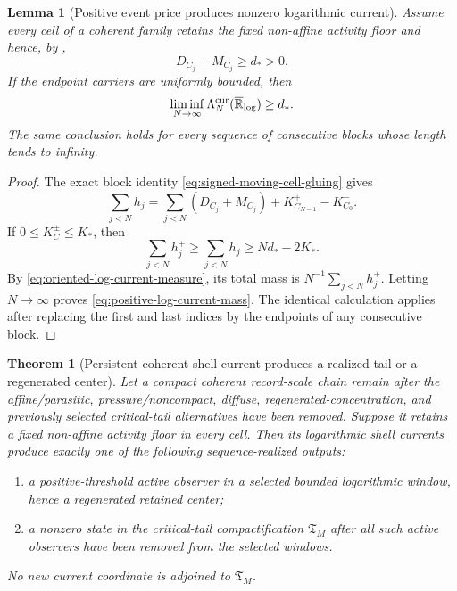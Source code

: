 \documentclass[11pt]{amsart}
\numberwithin{equation}{section}
\theoremstyle{plain}
\newtheorem{theorem}{Theorem}[section]
\newtheorem{lemma}[lemma]{Lemma}
\theoremstyle{definition}
\theoremstyle{remark}
\newcommand{\Tcrit}{\mathfrak T_M}
\begin{document}
\begin{lemma}[Positive event price produces nonzero logarithmic current]
\label{lem:positive-price-nonzero-log-current}
Assume every cell of a coherent family retains the fixed non-affine activity
floor and hence, by ,
\begin{equation}\label{eq:uniform-cell-price}
 D_{C_j}+M_{C_j}\ge d_*>0.
\end{equation}
If the endpoint carriers are uniformly bounded, then
\begin{equation}\label{eq:positive-log-current-mass}
 \liminf_{N\to\infty}
 \Lambda_N^{\rm cur}(\overline{\mathbb R}_{\log})
 \ge d_*.
\end{equation}
The same conclusion holds for every sequence of consecutive blocks whose
length tends to infinity.
\end{lemma}

\begin{proof}
The exact block identity \eqref{eq:signed-moving-cell-gluing} gives
\[
 \sum_{j<N}h_j
 =\sum_{j<N}(D_{C_j}+M_{C_j})
   +K_{C_{N-1}}^+-K_{C_0}^-.
\]
If \(0\le K_C^\pm\le K_*\), then
\[
 \sum_{j<N}h_j^+
 \ge\sum_{j<N}h_j
 \ge Nd_*-2K_*.
\]
By \eqref{eq:oriented-log-current-measure}, its total mass is
\(N^{-1}\sum_{j<N}h_j^+\).  Letting \(N\to\infty\) proves
\eqref{eq:positive-log-current-mass}.  The identical calculation applies
after replacing the first and last indices by the endpoints of any consecutive
block.
\end{proof}

\begin{theorem}[Persistent coherent shell current produces a realized tail or a regenerated center]
\label{thm:coherent-current-to-critical-tail}
Let a compact coherent record-scale chain remain after the affine/parasitic,
pressure/noncompact, diffuse, regenerated-concentration, and previously
selected critical-tail alternatives have been removed.  Suppose it retains a
fixed non-affine activity floor in every cell.  Then its logarithmic shell
currents produce exactly one of the following sequence-realized outputs:
\begin{enumerate}[label=\textup{(\roman*)}]
 \item a positive-threshold active observer in a selected bounded logarithmic
 window, hence a regenerated retained center;
 \item a nonzero state in the critical-tail compactification \(\Tcrit\) after
 all such active observers have been removed from the selected windows.
\end{enumerate}
No new current coordinate is adjoined to \(\Tcrit\).
\end{theorem}
\end{document}
